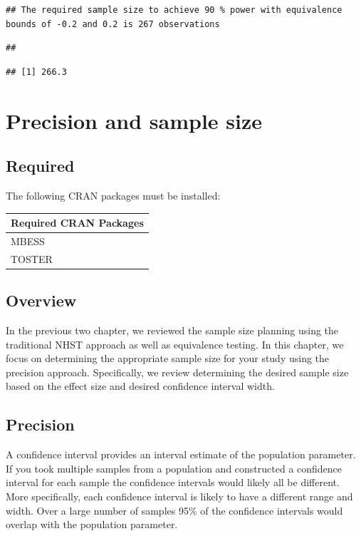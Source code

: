 \documentclass[
]{krantz}
\begin{document}
\begin{verbatim}
## The required sample size to achieve 90 % power with equivalence bounds of -0.2 and 0.2 is 267 observations
\end{verbatim}

\begin{verbatim}
## 
\end{verbatim}

\begin{verbatim}
## [1] 266.3
\end{verbatim}

\hypertarget{precision-and-sample-size}{%
\chapter{Precision and sample size}\label{precision-and-sample-size}}

\hypertarget{required-6}{%
\section{Required}\label{required-6}}

The following CRAN packages must be installed:

\begin{longtable}[]{@{}l@{}}
\toprule
Required CRAN Packages \\
\midrule
\endhead
MBESS \\
TOSTER \\
\bottomrule
\end{longtable}

\hypertarget{overview-5}{%
\section{Overview}\label{overview-5}}

In the previous two chapter, we reviewed the sample size planning using the traditional NHST approach as well as equivalence testing. In this chapter, we focus on determining the appropriate sample size for your study using the precision approach. Specifically, we review determining the desired sample size based on the effect size and desired confidence interval width.

\hypertarget{precision}{%
\section{Precision}\label{precision}}

A confidence interval provides an interval estimate of the population parameter. If you took multiple samples from a population and constructed a confidence interval for each sample the confidence intervals would likely all be different. More specifically, each confidence interval is likely to have a different range and width. Over a large number of samples 95\% of the confidence intervals would overlap with the population parameter.
\end{document}
